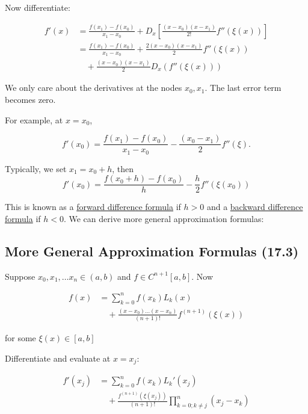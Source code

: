\documentclass[12pt]{article}
\begin{document}
Now differentiate:

\begin{align*}
    f'(x) &= \frac{f(x_1) - f(x_0)}{x_1 - x_0} + D_x \left[ \frac{(x - x_0)(x - x_1)}{2!} f''(\xi(x)) \right] \\
          &= \frac{f(x_1) - f(x_0)}{x_1 - x_0} + \frac{2 (x - x_0)(x - x_1)}{2} f''(\xi(x)) \\
          &\quad + \frac{(x - x_0)(x - x_1)}{2} D_x \left( f''(\xi(x)) \right)
\end{align*}

We only care about the derivatives at the nodes $x_0, x_1$. The last error term
becomes zero.

\pagebreak
For example, at $x=x_0$,

\[
f'(x_0) = \frac{f(x_1) - f(x_0)}{x_1 - x_0} - \frac{(x_0 - x_1)}{2} f''(\xi)
.\]

Typically, we set $x_1 = x_0+h$, then
\begin{equation}
  f'(x_0) = \frac{f(x_0+h) - f(x_0)}{h} - \frac{h}{2} f''(\xi(x_0))
  \label{eq:difference_formula}
\end{equation}

This is known as a \uline{forward difference formula} if $h>0$ and a \uline{backward
difference formula} if $h<0$. We can derive more general approximation formulas:

\subsection{More General Approximation Formulas (17.3)}\label{sec:more_general_approximation_formulas}

Suppose $x_0, x_1, \dots x_n \in (a,b)$ and $f\in C^{n+1}[a,b]$. Now

\begin{align*}
  f(x) &= \sum_{k=0}^n f(x_k) L_k(x) \\
  &\quad+ \frac{(x-x_0)\dots (x-x_n)}{(n+1)!} f^{(n+1)}(\xi(x))
\end{align*}

for some $\xi(x) \in [a,b]$

Differentiate and evaluate at $x=x_j$:

\begin{align*}
  f'(x_j) &= \sum_{k=0}^n f(x_k) L_k'(x_j) \\
          &\quad+ \frac{f^{(n+1)}(\xi(x_j))}{(n+1)!} \prod_{k=0; k\neq j}^{n} (x_j - x_k)
          \label{eq:three_point_formula}
\end{align*}
\end{document}
